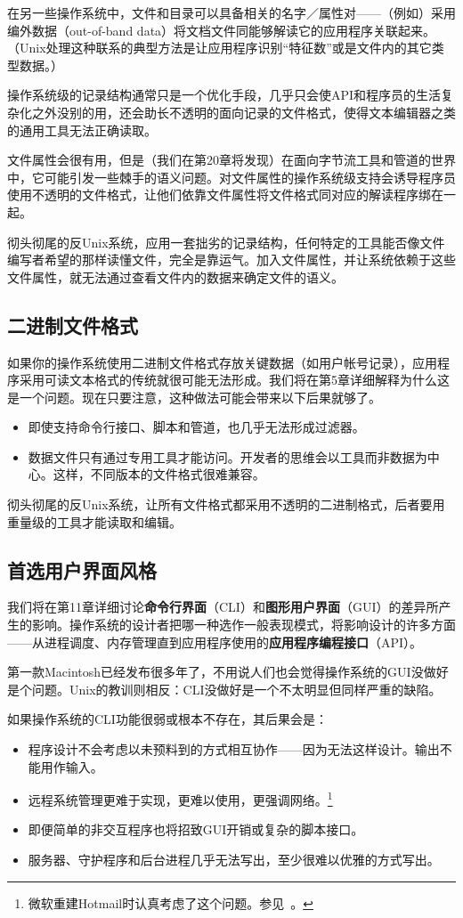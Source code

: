\documentclass[12pt,oneside]{ctexbook}
\begin{document}
\begin{common-format}
在另一些操作系统中，文件和目录可以具备相关的名字／属性对——（例如）采用编外数据（out-of-band data）将文档文件同能够解读它的应用程序关联起来。（Unix处理这种联系的典型方法是让应用程序识别“特征数”或是文件内的其它类型数据。）

操作系统级的记录结构通常只是一个优化手段，几乎只会使API和程序员的生活复杂化之外没别的用，还会助长不透明的面向记录的文件格式，使得文本编辑器之类的通用工具无法正确读取。

文件属性会很有用，但是（我们在第20章将发现）在面向字节流工具和管道的世界中，它可能引发一些棘手的语义问题。对文件属性的操作系统级支持会诱导程序员使用不透明的文件格式，让他们依靠文件属性将文件格式同对应的解读程序绑在一起。

彻头彻尾的反Unix系统，应用一套拙劣的记录结构，任何特定的工具能否像文件编写者希望的那样读懂文件，完全是靠运气。加入文件属性，并让系统依赖于这些文件属性，就无法通过查看文件内的数据来确定文件的语义。

\subsection{二进制文件格式}
如果你的操作系统使用二进制文件格式存放关键数据（如用户帐号记录），应用程序采用可读文本格式的传统就很可能无法形成。我们将在第5章详细解释为什么这是一个问题。现在只要注意，这种做法可能会带来以下后果就够了。

\begin{itemize}
\item 即使支持命令行接口、脚本和管道，也几乎无法形成过滤器。
\item 数据文件只有通过专用工具才能访问。开发者的思维会以工具而非数据为中心。这样，不同版本的文件格式很难兼容。
\end{itemize}

彻头彻尾的反Unix系统，让所有文件格式都采用不透明的二进制格式，后者要用重量级的工具才能读取和编辑。

\subsection{首选用户界面风格}
我们将在第11章详细讨论\textbf{命令行界面}（CLI）和\textbf{图形用户界面}（GUI）的差异所产生的影响。操作系统的设计者把哪一种选作一般表现模式，将影响设计的许多方面——从进程调度、内存管理直到应用程序使用的\textbf{应用程序编程接口}（API）。

第一款Macintosh已经发布很多年了，不用说人们也会觉得操作系统的GUI没做好是个问题。Unix的教训则相反：CLI没做好是一个不太明显但同样严重的缺陷。

如果操作系统的CLI功能很弱或根本不存在，其后果会是：
\begin{itemize}
\item 程序设计不会考虑以未预料到的方式相互协作——因为无法这样设计。输出不能用作输入。
\item 远程系统管理更难于实现，更难以使用，更强调网络。\footnote{微软重建Hotmail时认真考虑了这个问题。参见~\cite{BrooksD}。}
\item 即便简单的非交互程序也将招致GUI开销或复杂的脚本接口。
\item 服务器、守护程序和后台进程几乎无法写出，至少很难以优雅的方式写出。
\end{itemize}


\end{common-format}
\end{document}
